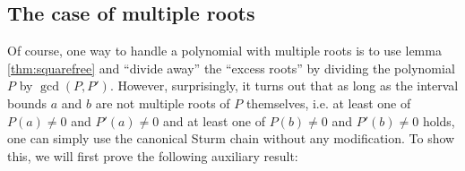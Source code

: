 \documentclass[11pt,a4paper,oneside]{article}
\newcommand{\RR}{\mathbb{R}}
\newcommand{\ie}{i.\,e.\xspace}
\begin{document}


\subsection{The case of multiple roots}

Of course, one way to handle a polynomial with multiple roots is to use lemma \ref{thm:squarefree} and \enquote{divide away} the \enquote{excess roots} by dividing the polynomial $P$ by $\gcd(P,P')$. However, surprisingly, it turns out that as long as the interval bounds $a$ and $b$ are not multiple roots of $P$ themselves, i.e. at least one of $P(a)\neq 0$ and $P'(a)\neq 0$ and at least one of $P(b)\neq 0$ and $P'(b)\neq 0$ holds, one can simply use the canonical Sturm chain without any modification. To show this, we will first prove the following auxiliary result:
\end{document}
